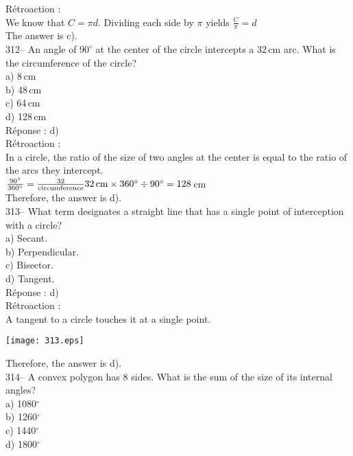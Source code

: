 \documentclass[letterpaper, 12pt]{article}
\begin{document}
R\'etroaction :\\
We know that $C=\pi d$. Dividing each side by $\pi$ yields $\frac{C}{\pi}=d$\\
The answer is c).\\


312-- An angle of $90^{\circ}$ at the center of the circle intercepts a 32\,cm arc. What is the circumference of the circle?\\

a) 8\,cm\\
b) 48\,cm\\
c) 64\,cm\\
d) 128\,cm\\

R\'eponse : d)\\

R\'etroaction :\\
In a circle, the ratio of the size of two angles at the center is equal to the ratio of the arcs they intercept.\\[2mm]
$\frac{90^{\circ}}{360^{\circ}}=\frac{32}{\textrm{circumference}}\\[2mm]
32\textrm{\,cm}\times360^{\circ}\div90^{\circ}=128$\,cm\\[2mm]
Therefore, the answer is d).\\

313-- What term designates a straight line that has a single point of interception with a circle?\\

a) Secant.\\
b) Perpendicular.\\
c) Bisector.\\
d) Tangent.\\

R\'eponse : d)\\

R\'etroaction :\\
A tangent to a circle touches it at a single point.
   \begin{center}
    \texttt{[image: 313.eps]}
    \end{center}
Therefore, the answer is d).\\

314-- A convex polygon has 8 sides. What is the sum of the size of its internal angles?\\

a) 1080$^{\circ}$\\
b) 1260$^{\circ}$\\
c) 1440$^{\circ}$\\
d) 1800$^{\circ}$\\
\end{document}
